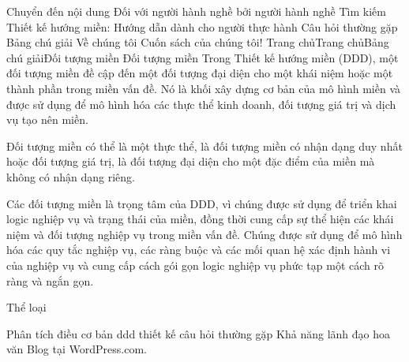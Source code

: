 





Chuyển đến nội dung
Đối với người hành nghề bởi người hành nghề
Tìm kiếm
Thiết kế hướng miền: Hướng dẫn dành cho người thực hành
Câu hỏi thường gặp
Bảng chú giải
Về chúng tôi
Cuốn sách của chúng tôi!
Trang chủTrang chủBảng chú giảiĐối tượng miền
Đối tượng miền
Trong Thiết kế hướng miền (DDD), một đối tượng miền đề cập đến một đối tượng đại diện cho một khái niệm hoặc một thành phần trong miền vấn đề. Nó là khối xây dựng cơ bản của mô hình miền và được sử dụng để mô hình hóa các thực thể kinh doanh, đối tượng giá trị và dịch vụ tạo nên miền.

Đối tượng miền có thể là một thực thể, là đối tượng miền có nhận dạng duy nhất hoặc đối tượng giá trị, là đối tượng đại diện cho một đặc điểm của miền mà không có nhận dạng riêng.

Các đối tượng miền là trọng tâm của DDD, vì chúng được sử dụng để triển khai logic nghiệp vụ và trạng thái của miền, đồng thời cung cấp sự thể hiện các khái niệm và đối tượng nghiệp vụ trong miền vấn đề. Chúng được sử dụng để mô hình hóa các quy tắc nghiệp vụ, các ràng buộc và các mối quan hệ xác định hành vi của nghiệp vụ và cung cấp cách gói gọn logic nghiệp vụ phức tạp một cách rõ ràng và ngắn gọn.


Thể loại

Phân tích
điều cơ bản
ddd
thiết kế
câu hỏi thường gặp
Khả năng lãnh đạo
hoa văn
Blog tại WordPress.com.

